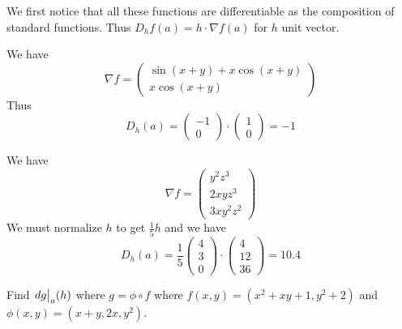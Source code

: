 \documentclass[10pt]{article}
\def\differ#1#2{\left.d#1\strut\right|_{#2}}
\begin{document}
\begin{blankpp}

    We first notice that all these functions are differentiable as the composition of standard functions.
    Thus $D_hf(a)=h\cdot\nabla f(a)$ for $h$ unit vector.
    \benum
        \item We have
            \[ \nabla f = \begin{pmatrix} \sin(x+y) + x\cos(x+y) \\ x\cos(x+y) \end{pmatrix} \]
            Thus
            \[ D_h(a) = \begin{pmatrix}-1\\0\end{pmatrix}\cdot\begin{pmatrix} 1 \\ 0\end{pmatrix} = -1 \]
        \item We have
            \[ \nabla f = \begin{pmatrix} y^2z^3 \\ 2xyz^3 \\ 3xy^2z^2 \end{pmatrix} \]
            We must normalize $h$ to get $\frac15 h$ and we have
            \[ D_h(a) = \frac15\begin{pmatrix} 4\\3\\0 \end{pmatrix}\cdot\begin{pmatrix} 4\\12\\36 \end{pmatrix} = 10.4 \]
    \eenum

\end{blankpp}

\begin{exercise*}

    Find $\differ ga(h)$ where $g=\phi\circ f$ where $f(x,y)=(x^2+xy+1,y^2+2)$ and $\phi(x,y)=(x+y,2x,y^2)$.

\end{exercise*}
\end{document}
